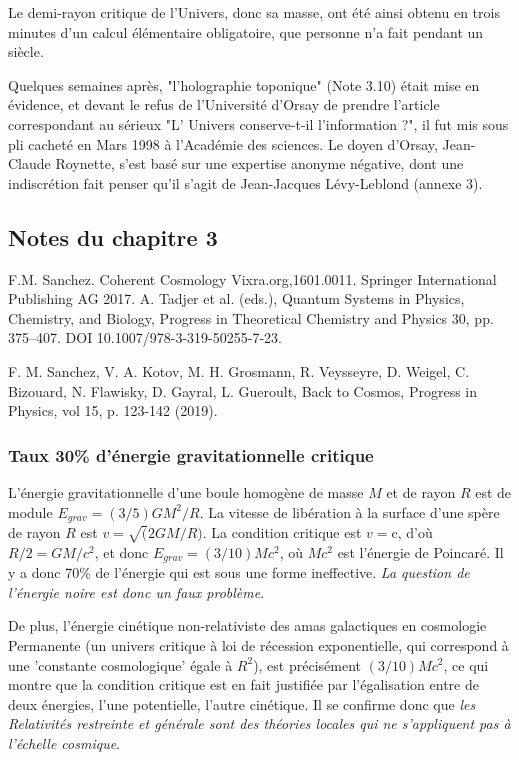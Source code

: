 \documentclass[a4paper,12pt]{article}
\begin{document}
Le demi-rayon critique de l'Univers, donc sa masse, ont été ainsi obtenu en trois minutes d’un calcul élémentaire obligatoire, que personne n’a fait pendant un siècle.

Quelques semaines après, "l'holographie toponique" (Note 3.10) était mise en évidence, et devant le refus de l'Université d'Orsay de prendre l'article correspondant au sérieux "L' Univers conserve-t-il l'information ?", il fut mis sous pli cacheté en Mars 1998 à l'Académie des sciences. Le doyen d'Orsay, Jean-Claude Roynette, s'est basé sur une expertise anonyme négative, dont une indiscrétion fait penser qu'il s'agit de Jean-Jacques Lévy-Leblond (annexe 3). 


\subsection{Notes du chapitre 3}
 
F.M. Sanchez. Coherent Cosmology Vixra.org,1601.0011. Springer International Publishing AG 2017. A. Tadjer et al. (eds.), Quantum Systems in Physics, Chemistry, and Biology, Progress in Theoretical Chemistry and Physics 30, pp. 375--407. DOI 10.1007/978-3-319-50255-7-23. 

F. M. Sanchez, V. A. Kotov,  M. H. Grosmann, R. Veysseyre, D. Weigel, C. Bizouard, N. Flawisky, D. Gayral, L. Gueroult, Back to Cosmos, Progress in Physics, vol 15, p. 123-142 (2019). 



\subsubsection{Taux 30\% d'énergie gravitationnelle critique  }

L'énergie gravitationnelle d'une boule homogène de masse $M$ et de rayon $R$ est de module $E_{grav} = (3/5)GM^2/R$. La vitesse de libération à la surface d’une spère de rayon $R$ est $v =\sqrt(2GM/R)$. La condition critique est $v = $c, d'où  $R/2 = GM/c^2$, et donc $E_{grav} = (3/10) Mc^2$, où $Mc^2$ est l'énergie de Poincaré. Il y a donc 70\% de l'énergie qui est sous une forme ineffective. \textit{La question de l’énergie noire est donc un faux problème}.


De plus, l'énergie cinétique non-relativiste des amas galactiques en cosmologie Permanente (un univers critique à loi de récession exponentielle, qui correspond à une 'constante cosmologique' égale à $R^2$), est précisément $(3/10) Mc^2$, ce qui montre que la condition critique est en fait justifiée par l'égalisation entre de deux énergies, l'une potentielle, l'autre cinétique. Il se confirme donc que \textit{les Relativités restreinte et générale sont des théories locales qui ne s'appliquent pas à l'échelle cosmique}.
\end{document}
